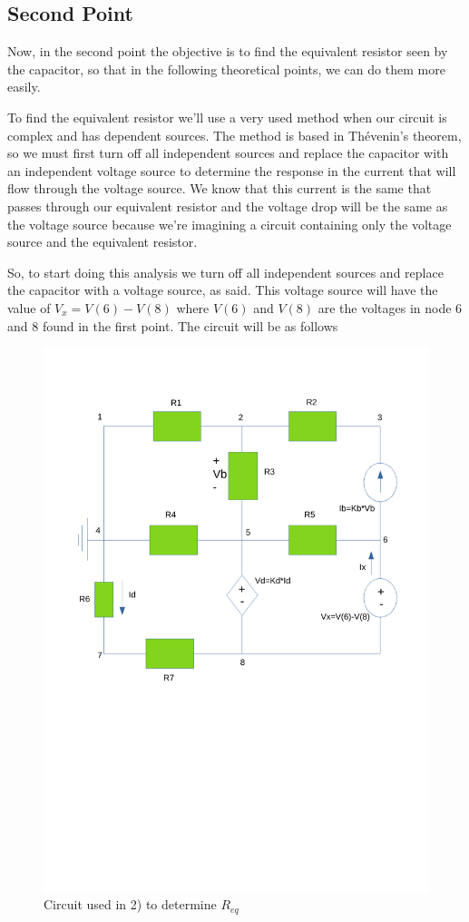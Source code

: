 \newpage

\subsection{Second Point}
\label{ssec:2T}

\noindent \par Now, in the second point the objective is to find the equivalent resistor seen by the capacitor, so that in the following theoretical points, we can do them more easily.
\par To find the equivalent resistor we'll use a very used method when our circuit is complex and has dependent sources. The method is based in Thévenin's theorem, so we must first turn off all independent sources and replace the capacitor with an independent voltage source to determine the response in the current that will flow through the voltage source. We know that this current is the same that passes through our equivalent resistor and the voltage drop will be the same as the voltage source because we're imagining a circuit containing only the voltage source and the equivalent resistor. 
\par So, to start doing this analysis we turn off all independent sources and replace the capacitor with a voltage source, as said. This voltage source will have the value of $V_x=V(6)-V(8)$ where $V(6)$ and $V(8)$ are the voltages in node 6 and 8 found in the first point. The circuit will be as follows

\begin{figure}[h!] \centering
\includegraphics[width=0.6\linewidth]{esquema.pdf}
\caption{Circuit used in 2) to determine $R_{eq}$}
\label{fig:Cir_2)}
\end{figure}

